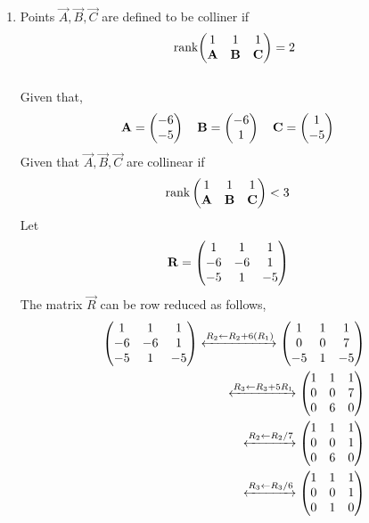 \documentclass[11pt]{book}
\begin{document}
\begin{enumerate}[label=\thesection.\arabic*.,ref=\thesection.\theenumi]
\item Points $\vec{A}, \vec{B}, \vec{C}$ are defined to be colliner if
	\begin{align}
		\text{rank}{\ensuremath{\begin{pmatrix}1 & 1 & 1 \\ \mathbf{A} & \mathbf{B} & \mathbf{C}\end{pmatrix}}} = 2
	\end{align}
\solution\\
Given that,
\begin{align}
    \mathbf{A} = \begin{pmatrix}-6\\-5\end{pmatrix}
    \quad
    \mathbf{B} &= \begin{pmatrix}-6\\ 1\end{pmatrix}
    \quad
    \mathbf{C} = \begin{pmatrix}1\\-5\end{pmatrix}
\end{align}
Given that $\vec{A},\vec{B},\vec{C}$ are collinear if
\begin{align}
    \text{rank}\myvec{
    1 & 1 & 1\\
    \vec{A} & \vec{B} & \vec{C} \\
    } &< 3 
    \label{eq:1.1.3,2}
\end{align} 
Let
\begin{align}
    \mathbf{R}&=\begin{pmatrix}
    1 & 1 & 1
    \\
    -6 & -6 & 1
    \\
    -5 & 1 & -5
    \end{pmatrix} 
\end{align} 
The matrix $\vec{R}$ can be row reduced as follows,
\begin{align}
    \label{eq:matthrowoperations}
    \myvec{
    1 & 1 & 1
    \\
    -6 & -6 & 1
    \\
    -5 & 1 & -5
    }
	\xleftrightarrow[]{R_2 \leftarrow R_2+6(R_1)}
    \myvec{
    1 & 1 & 1
    \\
    0 & 0 & 7
    \\
    -5 & 1 & -5
    }
    \\
     \xleftrightarrow[]{R_3\leftarrow R_3+5R_1}
    \myvec{
    1 & 1 & 1
    \\
    0 & 0 & 7
    \\
    0 & 6 & 0
    }
    \\
     \xleftrightarrow[]{R_2\leftarrow R_2/7}
    \myvec{
    1 & 1 & 1
    \\
    0 & 0 & 1
    \\
    0 & 6 & 0
    }
    \\
     \xleftrightarrow[]{R_3\leftarrow R_3/6}
    \myvec{
    1 & 1 & 1
    \\
    0 & 0 & 1
    \\
    0 & 1 & 0
    }
\end{align}


\end{enumerate}
\end{document}
